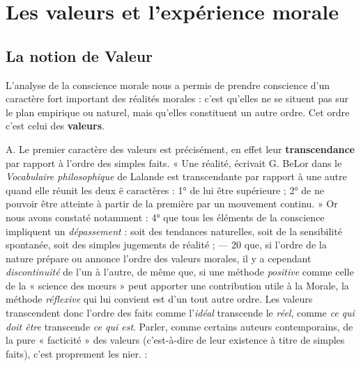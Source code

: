 
\section{Les valeurs et l'expérience morale}
\subsection{}
\subsection{La notion de Valeur}
L'analyse de la conscience morale
nous a permis de prendre conscience d’un caractère fort important des
réalités morales : c’est qu’elles ne se situent pas sur le plan empirique
ou naturel, mais qu’elles constituent un autre ordre. Cet ordre
c’est celui des {\bf valeurs}.

A. Le premier caractère des valeurs est précisément, en effet
leur {\bf transcendance} par rapport à l’ordre des simples faits. « Une réalité,
écrivait G. BeLor dans le {\it Vocabulaire philosophique} de Lalande
est transcendante par rapport à une autre quand elle réunit les deux ë
caractères : 1° de lui être supérieure ; 2° de ne pouvoir être atteinte à
partir de la première par un mouvement continu. » Or nous avons
constaté notamment : 4° que tous les éléments de la conscience
impliquent un {\it dépassement} : soit des tendances naturelles, soit de la
sensibilité spontanée, soit des simples jugements de réalité ; — 20 que,
si l’ordre de la nature prépare ou annonce l’ordre des valeurs morales,
il y a cependant {\it discontinuité} de l’un à l’autre, de même que, si une
méthode {\it positive} comme celle de la « science des mœurs » peut
apporter une contribution utile à la Morale, la méthode {\it réflexive} qui
lui convient est d’un tout autre ordre. Les valeurs transcendent donc
l’ordre des faits comme l'{\it idéal} transcende le {\it réel}, comme {\it ce qui doit
être} transcende {\it ce qui est}. Parler, comme certains auteurs contemporains,
de la pure « facticité » des valeurs (c’est-à-dire de leur existence
à titre de simples faits), c’est proprement les nier. :

